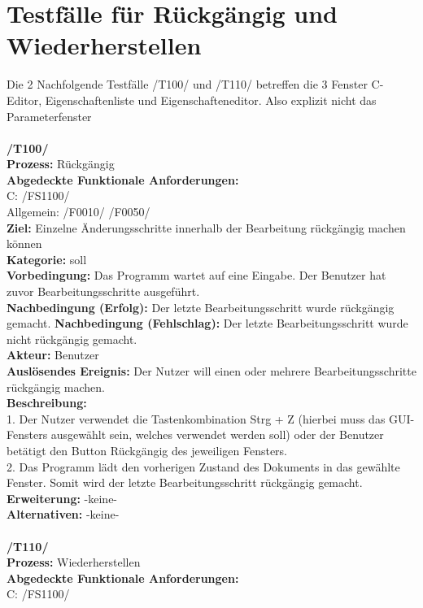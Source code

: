 \documentclass[a4paper]{scrreprt}
\begin{document}
\section{Testfälle für Rückgängig und Wiederherstellen}
Die 2 Nachfolgende Testfälle /T100/ und /T110/ betreffen die 3 Fenster C-Editor, Eigenschaftenliste und Eigenschafteneditor. Also explizit nicht das Parameterfenster \\\\
\textbf{/T100/} \\ 
\textbf{Prozess: }Rückgängig \\
\textbf{Abgedeckte Funktionale Anforderungen:}\\
C: /FS1100/ \\
Allgemein: /F0010/ /F0050/ \\
\textbf{Ziel:} Einzelne Änderungsschritte innerhalb der Bearbeitung rückgängig machen können\\
\textbf{Kategorie:} soll\\
\textbf{Vorbedingung:} Das Programm wartet auf eine Eingabe. Der Benutzer hat zuvor Bearbeitungsschritte ausgeführt. \\
\textbf{Nachbedingung (Erfolg):} Der letzte Bearbeitungsschritt wurde rückgängig gemacht.
\textbf{Nachbedingung (Fehlschlag):} Der letzte Bearbeitungsschritt wurde nicht rückgängig gemacht.\\
\textbf{Akteur:} Benutzer\\
\textbf{Auslösendes Ereignis:} Der Nutzer will einen oder mehrere Bearbeitungsschritte rückgängig machen.\\
\textbf{Beschreibung:} \\
1. Der Nutzer verwendet die Tastenkombination Strg + Z (hierbei muss das GUI-Fensters ausgewählt sein, welches verwendet werden soll) oder der Benutzer betätigt den Button Rückgängig des jeweiligen Fensters.\\
2. Das Programm lädt den vorherigen Zustand des Dokuments in das gewählte Fenster. Somit wird der letzte Bearbeitungsschritt rückgängig gemacht. \\
\textbf {Erweiterung:} -keine- \\
\textbf {Alternativen:} -keine- \\\\
\textbf{/T110/} \\ 
\textbf{Prozess: }Wiederherstellen \\
\textbf{Abgedeckte Funktionale Anforderungen:}\\
C: /FS1100/ \\
\end{document}
